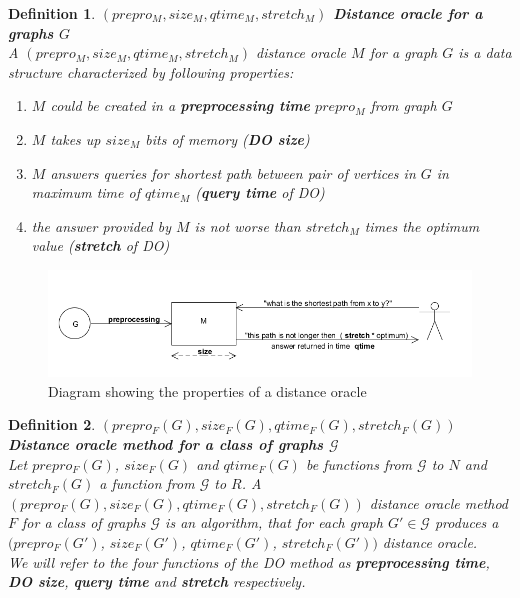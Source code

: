 \documentclass[a4paper]{article}
\newtheorem{definition}{Definition}
\begin{document}
        \begin{definition}
            \textbf{{\boldmath $(prepro_{M}, size_{M}, qtime_{M}, stretch_{M})$} Distance oracle for a graphs $G$} \\
            A $(prepro_{M}, size_{M}, qtime_{M}, stretch_{M})$ distance oracle $M$ for a graph $G$ is a data structure characterized by following properties:
            \begin{enumerate}
                \item $M$ could be created in a \textbf{preprocessing time} $prepro_{M}$ from graph $G$
                \item $M$ takes up $size_{M}$ bits of memory (\textbf{DO size})
                \item $M$ answers queries for shortest path between pair of vertices in $G$ in maximum time of $qtime_{M}$ (\textbf{query time} of DO)
                \item the answer provided by $M$ is not worse than $stretch_{M}$ times the optimum value (\textbf{stretch} of DO)
            \end{enumerate}
        \end{definition}

        \begin{figure}[h!]
            \includegraphics[scale=0.57]{dodiagram.png}
            \caption{\label{fig:dodiagram} Diagram showing the properties of a distance oracle}
        \end{figure}

        \begin{definition}
            \textbf{{\boldmath $(prepro_{F}(G), size_{F}(G), qtime_{F}(G), stretch_{F}(G))$} Distance oracle method for a class of graphs $\mathcal{G}$}\\
            Let $prepro_{F}(G)$, $size_{F}(G)$ and $qtime_{F}(G)$ be functions from $\mathcal{G}$ to $N$ and $stretch_{F}(G)$ a function from $\mathcal{G}$ to $R$. A $(prepro_{F}(G), size_{F}(G), qtime_{F}(G), stretch_{F}(G))$ distance oracle method $F$ for a class of graphs $\mathcal{G}$ is an algorithm, that for each graph $G' \in \mathcal{G}$ produces a $(prepro_{F}(G')$, $size_{F}(G')$, $qtime_{F}(G')$, $stretch_{F}(G'))$ \emph{distance oracle}. \\
            \noindent We will refer to the four functions of the DO method as \textbf{preprocessing time}, \textbf{DO size}, \textbf{query time} and \textbf{stretch} respectively.
        \end{definition}
\end{document}
